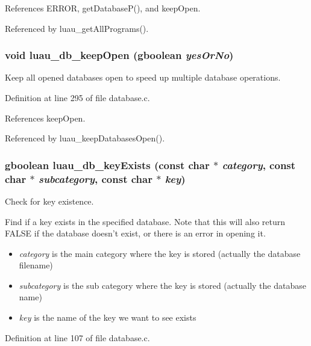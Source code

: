 References ERROR, get\-Database\-P(), and keep\-Open.

Referenced by luau\_\-get\-All\-Programs().
\subsubsection{\setlength{\rightskip}{0pt plus 5cm}void luau\_\-db\_\-keep\-Open (gboolean {\em yes\-Or\-No})}\label{database_8h_a10}


Keep all opened databases open to speed up multiple database operations. 



Definition at line 295 of file database.c.

References keep\-Open.

Referenced by luau\_\-keep\-Databases\-Open().
\subsubsection{\setlength{\rightskip}{0pt plus 5cm}gboolean luau\_\-db\_\-key\-Exists (const char $\ast$ {\em category}, const char $\ast$ {\em subcategory}, const char $\ast$ {\em key})}\label{database_8h_a2}


Check for key existence. 

Find if a key exists in the specified database. Note that this will also return FALSE if the database doesn't exist, or there is an error in opening it.

\begin{itemize}
\item {\em category\/} is the main category where the key is stored (actually the database filename) \item {\em subcategory\/} is the sub category where the key is stored (actually the database name) \item {\em key\/} is the name of the key we want to see exists 
\end{itemize}


Definition at line 107 of file database.c.

